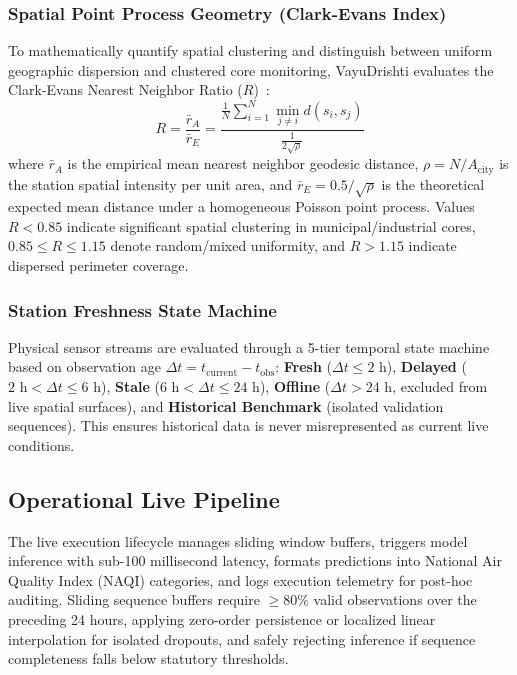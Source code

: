 \documentclass[conference]{IEEEtran}
\begin{document}
\subsubsection{Spatial Point Process Geometry (Clark-Evans Index)}
To mathematically quantify spatial clustering and distinguish between uniform geographic dispersion and clustered core monitoring, VayuDrishti evaluates the Clark-Evans Nearest Neighbor Ratio ($R$)~\cite{clark1954distance}:
\begin{equation}
R = \frac{\bar{r}_A}{\bar{r}_E} = \frac{\frac{1}{N}\sum_{i=1}^N \min_{j \ne i} d(s_i, s_j)}{\frac{1}{2\sqrt{\rho}}}
\end{equation}
where $\bar{r}_A$ is the empirical mean nearest neighbor geodesic distance, $\rho = N / A_{\text{city}}$ is the station spatial intensity per unit area, and $\bar{r}_E = 0.5 / \sqrt{\rho}$ is the theoretical expected mean distance under a homogeneous Poisson point process. Values $R < 0.85$ indicate significant spatial clustering in municipal/industrial cores, $0.85 \le R \le 1.15$ denote random/mixed uniformity, and $R > 1.15$ indicate dispersed perimeter coverage.

\subsubsection{Station Freshness State Machine}
Physical sensor streams are evaluated through a 5-tier temporal state machine based on observation age $\Delta t = t_{\text{current}} - t_{\text{obs}}$: \textbf{Fresh} ($\Delta t \le 2\text{ h}$), \textbf{Delayed} ($2\text{ h} < \Delta t \le 6\text{ h}$), \textbf{Stale} ($6\text{ h} < \Delta t \le 24\text{ h}$), \textbf{Offline} ($\Delta t > 24\text{ h}$, excluded from live spatial surfaces), and \textbf{Historical Benchmark} (isolated validation sequences). This ensures historical data is never misrepresented as current live conditions.

\subsection{Operational Live Pipeline}
The live execution lifecycle manages sliding window buffers, triggers model inference with sub-100 millisecond latency, formats predictions into National Air Quality Index (NAQI) categories, and logs execution telemetry for post-hoc auditing. Sliding sequence buffers require $\ge 80\%$ valid observations over the preceding 24 hours, applying zero-order persistence or localized linear interpolation for isolated dropouts, and safely rejecting inference if sequence completeness falls below statutory thresholds.
\end{document}
